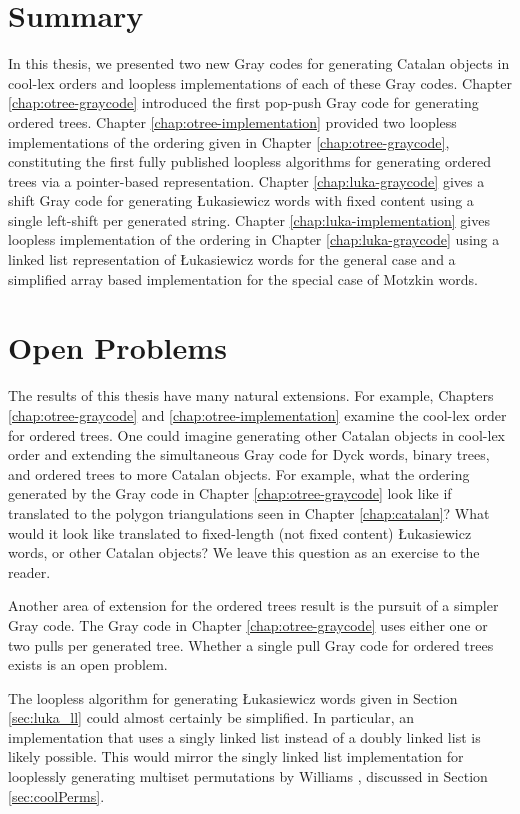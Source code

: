 \section{Summary} 
In this thesis, we presented two new Gray codes for generating Catalan objects in cool-lex orders and loopless implementations of each of these Gray codes.  Chapter \ref{chap:otree-graycode} introduced the first pop-push Gray code for generating ordered trees.  Chapter \ref{chap:otree-implementation} provided two loopless implementations of the ordering given in Chapter \ref{chap:otree-graycode}, constituting the first fully published loopless algorithms for generating ordered trees via a pointer-based representation.  Chapter \ref{chap:luka-graycode} gives a shift Gray code for generating Łukasiewicz words with fixed content using a single left-shift per generated string. Chapter \ref{chap:luka-implementation} gives loopless implementation of the ordering in Chapter \ref{chap:luka-graycode} using a linked list representation of Łukasiewicz words for the general case and a simplified array based implementation for the special case of Motzkin words.

\section{Open Problems}

The results of this thesis have many natural extensions.  For example, Chapters \ref{chap:otree-graycode} and \ref{chap:otree-implementation} examine the cool-lex order for ordered trees. One could imagine generating other Catalan objects in cool-lex order and extending the simultaneous Gray code for Dyck words, binary trees, and ordered trees to more Catalan objects.  For example, what the ordering generated by the Gray code in Chapter \ref{chap:otree-graycode} look like if translated to the polygon triangulations seen in Chapter \ref{chap:catalan}?  What would it look like translated to fixed-length (not fixed content) Łukasiewicz words, or other Catalan objects? We leave this question as an exercise to the reader.  

Another area of extension for the ordered trees result is the pursuit of a simpler Gray code. The Gray code in Chapter \ref{chap:otree-graycode} uses either one or two pulls per generated tree.  Whether a single pull Gray code for ordered trees exists is an open problem.  

The loopless algorithm for generating Łukasiewicz words given in Section \ref{sec:luka_ll} could almost certainly be simplified.  In particular, an implementation that uses a singly linked list instead of a doubly linked list  is likely possible.  This would mirror the singly linked list implementation for looplessly generating multiset permutations by Williams \cite{williams2009loopless}, discussed in Section \ref{sec:coolPerms}.


